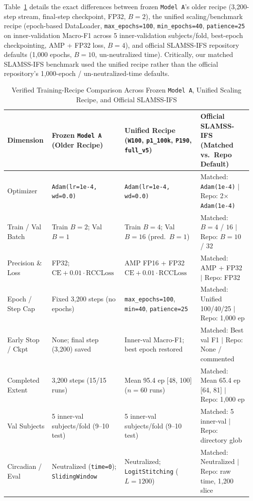 \documentclass[journal]{IEEEtran}
\begin{document}
Table~\ref{tab:recipe} details the exact differences between frozen \texttt{Model~A}'s older recipe (3,200-step stream, final-step checkpoint, FP32, $B=2$), the unified scaling/benchmark recipe (epoch-based DataLoader, \texttt{max\_epochs=100}, \texttt{min\_epochs=40}, \texttt{patience=25} on inner-validation Macro-F1 across 5 inner-validation subjects/fold, best-epoch checkpointing, AMP + FP32 loss, $B=4$), and official SLAMSS-IFS repository defaults (1,000 epochs, $B=10$, un-neutralized time). Critically, our matched SLAMSS-IFS benchmark used the unified recipe rather than the official repository's 1,000-epoch / un-neutralized-time defaults.

\begin{table}[!t]
\centering
\caption{Verified Training-Recipe Comparison Across Frozen \texttt{Model~A}, Unified Scaling Recipe, and Official SLAMSS-IFS}
\label{tab:recipe}
\footnotesize
\begin{tabular}{@{}llll@{}}
\toprule
Dimension & Frozen \texttt{Model~A} (Older Recipe) & Unified Recipe (\texttt{W100}, \texttt{p1\_100k}, \texttt{P190}, \texttt{full\_v5}) & Official SLAMSS-IFS (Matched vs.\ Repo Default) \\
\midrule
Optimizer & \texttt{Adam(lr=1e-4, wd=0.0)} & \texttt{Adam(lr=1e-4, wd=0.0)} & Matched: \texttt{Adam(1e-4)} $|$ Repo: 2$\times$\texttt{Adam(1e-4)} \\
Train / Val Batch & Train $B=2$; Val $B=1$ & Train $B=4$; Val $B=16$ (pred.\ $B=1$) & Matched: $B=4$ / $16$ $|$ Repo: $B=10$ / $32$ \\
Precision \& Loss & FP32; $\text{CE} + 0.01\cdot\text{RCCLoss}$ & AMP FP16 + FP32 $\text{CE} + 0.01\cdot\text{RCCLoss}$ & Matched: AMP + FP32 $|$ Repo: FP32 \\
Epoch / Step Cap & Fixed 3,200 steps (no epochs) & \texttt{max\_epochs=100}, \texttt{min=40}, \texttt{patience=25} & Matched: Unified 100/40/25 $|$ Repo: 1,000 ep \\
Early Stop / Ckpt & None; final step (3,200) saved & Inner-val Macro-F1; best epoch restored & Matched: Best val F1 $|$ Repo: None / commented \\
Completed Extent & 3,200 steps (15/15 runs) & Mean 95.4 ep [48, 100] ($n=60$ runs) & Matched: Mean 65.4 ep [64, 81] $|$ Repo: 1,000 ep \\
Val Subjects & 5 inner-val subjects/fold (9--10 test) & 5 inner-val subjects/fold (9--10 test) & Matched: 5 inner-val $|$ Repo: directory glob \\
Circadian / Eval & Neutralized (\texttt{time=0}); \texttt{SlidingWindow} & Neutralized; \texttt{LogitStitching} ($L=1200$) & Matched: Neutralized $|$ Repo: raw time, 1,200 slice \\
\bottomrule
\end{tabular}
\end{table}
\end{document}
